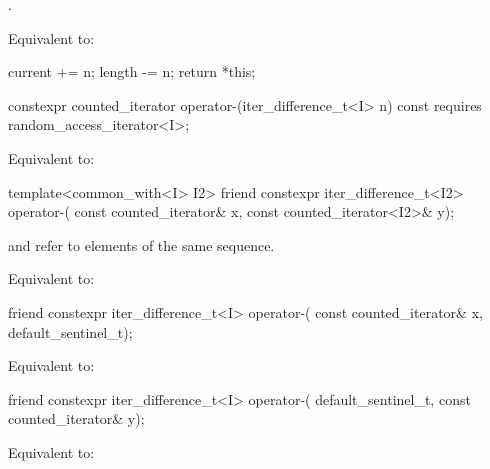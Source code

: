 \begin{itemdescr}
\pnum
\expects
{}.

\pnum
\effects
Equivalent to:
\begin{codeblock}
current += n;
length -= n;
return *this;
\end{codeblock}
\end{itemdescr}

%
\begin{itemdecl}
  constexpr counted_iterator operator-(iter_difference_t<I> n) const
    requires random_access_iterator<I>;
\end{itemdecl}

\begin{itemdescr}
\pnum
\effects
Equivalent to: 
\end{itemdescr}

%
\begin{itemdecl}
template<common_with<I> I2>
  friend constexpr iter_difference_t<I2> operator-(
    const counted_iterator& x, const counted_iterator<I2>& y);
\end{itemdecl}

\begin{itemdescr}
\pnum
\expects
{} and  refer to elements of the same
sequence.

\pnum
\effects
Equivalent to: 
\end{itemdescr}

%
\begin{itemdecl}
friend constexpr iter_difference_t<I> operator-(
  const counted_iterator& x, default_sentinel_t);
\end{itemdecl}

\begin{itemdescr}
\pnum
\effects
Equivalent to:
\end{itemdescr}

%
\begin{itemdecl}
friend constexpr iter_difference_t<I> operator-(
  default_sentinel_t, const counted_iterator& y);
\end{itemdecl}

\begin{itemdescr}
\pnum
\effects
Equivalent to: 
\end{itemdescr}

